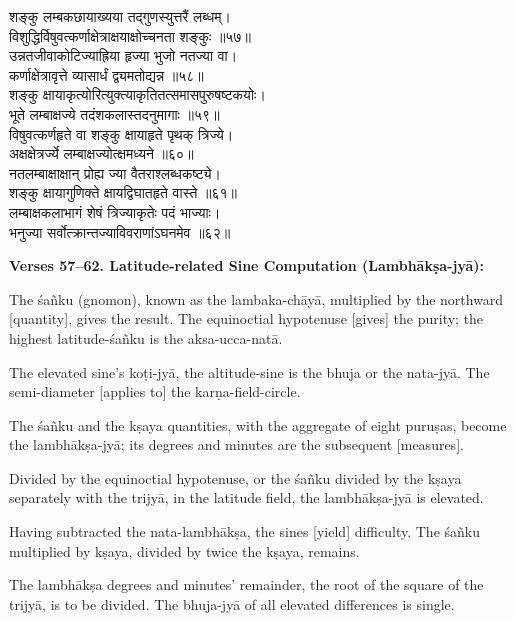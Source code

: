 \documentclass[11pt,a4paper]{article}
\begin{document}
\begin{minipage}[t]{0.48\textwidth}
\small\devanagarifont
शङ्कु लम्बकछायाख्यया तद्‌गुणस्युत्तरैं लब्धम्।\\
विशुद्धिर्विषुवत्कर्णाक्षेत्राक्षयाक्षोच्चनता शङ्कुः ॥५७॥\\[0.5em]
उन्नतजीवाकोटिज्याह्रिया हृज्या भुजो नतज्या वा।\\
कर्णाक्षेत्रावृत्ते व्यासार्धं द्व्यमतोद्यन्न ॥५८॥\\[0.5em]
शङ्कु क्षायाकृत्योरित्युक्त्याकृतितत्समासपुरुषष्टकयोः।\\
भूते लम्बाक्षज्ये तदंशकलास्तदनुमागाः ॥५९॥\\[0.5em]
विषुवत्कर्णहृते वा शङ्कु क्षायाहृते पृथक् त्रिज्ये।\\
अक्षक्षेत्रर्ज्ये लम्बाक्षज्योत्क्षमध्यने ॥६०॥\\[0.5em]
नतलम्बाक्षाक्षान् प्रोह्य ज्या वैतराश्लब्धकष्ट्ये।\\
शङ्कु क्षायागुणिक्ते क्षायद्विघातहृते वास्ते ॥६१॥\\[0.5em]
लम्बाक्षकलाभागं शेषं त्रिज्याकृतेः पदं भाज्याः।\\
भनुज्या सर्वोत्क्रान्तज्याविवराणांऽघनमेव ॥६२॥
\end{minipage}%
\hfill
\begin{minipage}[t]{0.48\textwidth}
\small
\textbf{Verses 57--62. Latitude-related Sine Computation (Lambh\=ak\d{s}a-jy\=a):}

The \'sa\~nku (gnomon), known as the lambaka-ch\=ay\=a, multiplied by the northward [quantity], gives the result. The equinoctial hypotenuse [gives] the purity; the highest latitude-\'sa\~nku is the aksa-ucca-nat\=a.

The elevated sine's ko\d{t}i-jy\=a, the altitude-sine is the bhuja or the nata-jy\=a. The semi-diameter [applies to] the kar\d{n}a-field-circle.

The \'sa\~nku and the k\d{s}aya quantities, with the aggregate of eight puru\d{s}as, become the lambh\=ak\d{s}a-jy\=a; its degrees and minutes are the subsequent [measures].

Divided by the equinoctial hypotenuse, or the \'sa\~nku divided by the k\d{s}aya separately with the trijy\=a, in the latitude field, the lambh\=ak\d{s}a-jy\=a is elevated.

Having subtracted the nata-lambh\=ak\d{s}a, the sines [yield] difficulty. The \'sa\~nku multiplied by k\d{s}aya, divided by twice the k\d{s}aya, remains.

The lambh\=ak\d{s}a degrees and minutes' remainder, the root of the square of the trijy\=a, is to be divided. The bhuja-jy\=a of all elevated differences is single.
\end{minipage}
\end{document}
